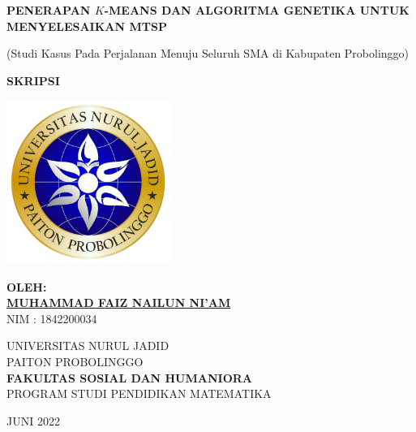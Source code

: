 \begin{titlepage}
   \begin{center}

       \textbf{PENERAPAN $K$-MEANS DAN ALGORITMA GENETIKA UNTUK MENYELESAIKAN MTSP}
       
       (Studi Kasus Pada Perjalanan Menuju Seluruh SMA di Kabupaten Probolinggo)

       \vfill
       \textbf{SKRIPSI}
       \vfill
       
       \includegraphics[width=0.4\textwidth]{logo.png}
       
       \vfill
       
       \textbf{OLEH:}\\
       \textbf{\underline{MUHAMMAD FAIZ NAILUN NI'AM}}\\
       NIM : 1842200034

       \vfill
       
       UNIVERSITAS NURUL JADID\\
       PAITON PROBOLINGGO\\
       \textbf{FAKULTAS SOSIAL DAN HUMANIORA}\\       
       PROGRAM STUDI PENDIDIKAN MATEMATIKA\\
       
       \vfill       
       
       JUNI 2022
       
   \end{center}
\end{titlepage}